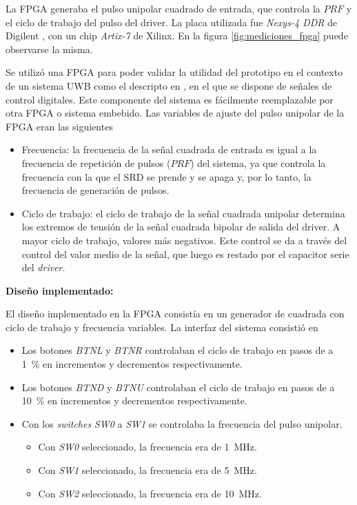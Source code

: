 La FPGA generaba el pulso unipolar cuadrado de entrada, que controla la
$PRF$ y el ciclo de trabajo del pulso del driver. La placa utilizada fue
\textit{Nexys-4 DDR} de Digilent \cite{digilent_nexys4ddr}, con un chip
\textit{Artix-7} de Xilinx. En la figura \ref{fig:mediciones_fpga} puede
observarse la misma. 

Se utilizó una FPGA para poder validar la utilidad del prototipo en el contexto
de un sistema UWB como el descripto en \cite{altieri2017}, en el que se dispone
de señales de control digitales. Este componente del sistema es fácilmente
reemplazable por otra FPGA o sistema embebido. Las variables de ajuste del pulso
unipolar de la FPGA eran las siguientes

\begin{itemize}
  \item Frecuencia: la frecuencia de la señal cuadrada de entrada es igual a la
    frecuencia de repetición de pulsos ($PRF$) del sistema, ya que controla la
    frecuencia con la que el SRD se prende y se apaga y, por lo tanto,
    la frecuencia de generación de pulsos.
  \item Ciclo de trabajo: el ciclo de trabajo de la señal cuadrada unipolar
    determina los extremos de tensión de la señal cuadrada bipolar de salida del
    driver. A mayor ciclo de trabajo, valores más negativos. Este control se da
    a través del control del valor medio de la señal, que luego es restado por
    el capacitor serie del \textit{driver}.
\end{itemize}

\textbf{Diseño implementado:}

El diseño implementado en la FPGA consistía en un generador de cuadrada con
ciclo de trabajo y frecuencia variables. La interfaz del sistema consistió en

\begin{itemize}
  \item Los botones \textit{BTNL} y \textit{BTNR} controlaban el ciclo de
    trabajo en pasos de a \qty{1}{\percent} en incrementos y decrementos
    respectivamente.
  \item Los botones \textit{BTND} y \textit{BTNU} controlaban el ciclo de
    trabajo en pasos de a \qty{10}{\percent} en incrementos y decrementos
    respectivamente.
  \item Con los \textit{switches} \textit{SW0} a \textit{SW1} se controlaba la
    frecuencia del pulso unipolar.
    \begin{itemize}
      \item Con \textit{SW0} seleccionado, la frecuencia era de
        \qty{1}{\mega\hertz}.
      \item Con \textit{SW1} seleccionado, la frecuencia era de
        \qty{5}{\mega\hertz}.
      \item Con \textit{SW2} seleccionado, la frecuencia era de
        \qty{10}{\mega\hertz}.
    \end{itemize}
\end{itemize}

